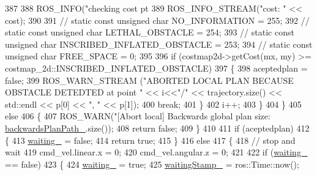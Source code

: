 \begin{DoxyCode}
{387 
388             ROS\_INFO(\textcolor{stringliteral}{"checking cost pt %
389             ROS\_INFO\_STREAM(\textcolor{stringliteral}{"cost: "} << cost);
390 
391             \textcolor{comment}{// static const unsigned char NO\_INFORMATION = 255;}
392             \textcolor{comment}{// static const unsigned char LETHAL\_OBSTACLE = 254;}
393             \textcolor{comment}{// static const unsigned char INSCRIBED\_INFLATED\_OBSTACLE = 253;}
394             \textcolor{comment}{// static const unsigned char FREE\_SPACE = 0;}
395 
396             \textcolor{keywordflow}{if} (costmap2d->getCost(mx, my) >= costmap\_2d::INSCRIBED\_INFLATED\_OBSTACLE)
397             \{
398                 aceptedplan = \textcolor{keyword}{false};
399                 ROS\_WARN\_STREAM (\textcolor{stringliteral}{"ABORTED LOCAL PLAN BECAUSE OBSTACLE DETEDTED at point "} << i<<\textcolor{stringliteral}{"/"} << 
      trajectory.size() << std::endl << p[0] << \textcolor{stringliteral}{", "} << p[1]);
400                 \textcolor{keywordflow}{break};
401             \}
402             i++;
403         \}
404     \}
405     \textcolor{keywordflow}{else}
406     \{
407         ROS\_WARN(\textcolor{stringliteral}{"[Abort local] Backwards global plan size: %
      \hyperlink{classmove__base__z__client_1_1backward__local__planner_1_1BackwardLocalPlanner_a451add2af7d6d83a7415277311b3ed04}{backwardsPlanPath\_}.size());
408         \textcolor{keywordflow}{return} \textcolor{keyword}{false};
409     \}
410 
411     \textcolor{keywordflow}{if} (aceptedplan)
412     \{
413         \hyperlink{classmove__base__z__client_1_1backward__local__planner_1_1BackwardLocalPlanner_a6969156ab6f82e03418987af4c5bd589}{waiting\_} = \textcolor{keyword}{false};
414         \textcolor{keywordflow}{return} \textcolor{keyword}{true};
415     \}
416     \textcolor{keywordflow}{else}
417     \{
418         \textcolor{comment}{// stop and wait}
419         cmd\_vel.linear.x = 0;
420         cmd\_vel.angular.z = 0;
421 
422         \textcolor{keywordflow}{if} (\hyperlink{classmove__base__z__client_1_1backward__local__planner_1_1BackwardLocalPlanner_a6969156ab6f82e03418987af4c5bd589}{waiting\_} == \textcolor{keyword}{false})
423         \{
424             \hyperlink{classmove__base__z__client_1_1backward__local__planner_1_1BackwardLocalPlanner_a6969156ab6f82e03418987af4c5bd589}{waiting\_} = \textcolor{keyword}{true};
425             \hyperlink{classmove__base__z__client_1_1backward__local__planner_1_1BackwardLocalPlanner_aea0e5312bd482daafc0b8779efaf56a0}{waitingStamp\_} = ros::Time::now();
}}}
\end{DoxyCode}
